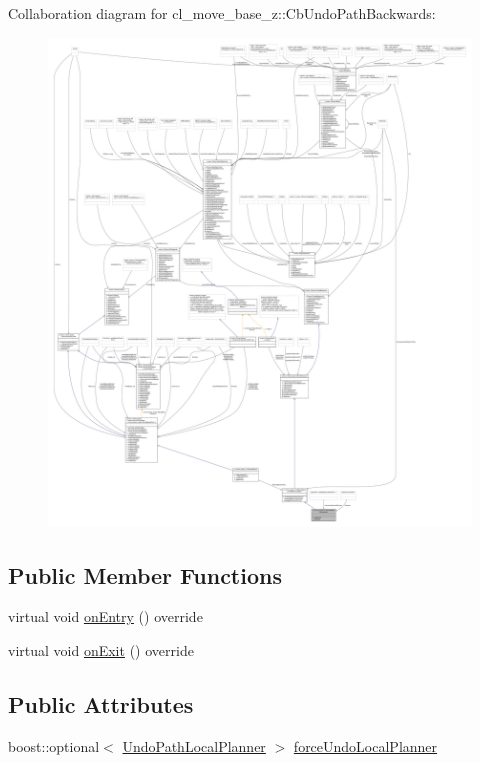 Collaboration diagram for cl\+\_\+move\+\_\+base\+\_\+z\+:\+:Cb\+Undo\+Path\+Backwards\+:
\nopagebreak
\begin{figure}[H]
\begin{center}
\leavevmode
\includegraphics[width=350pt]{classcl__move__base__z_1_1CbUndoPathBackwards__coll__graph}
\end{center}
\end{figure}
\subsection*{Public Member Functions}
\begin{DoxyCompactItemize}
\item 
virtual void \hyperlink{classcl__move__base__z_1_1CbUndoPathBackwards_a32e680530375b62c7053bf173f6b2b1b}{on\+Entry} () override
\item 
virtual void \hyperlink{classcl__move__base__z_1_1CbUndoPathBackwards_a20cee921ad92db16f8d17c3c3b9c2daf}{on\+Exit} () override
\end{DoxyCompactItemize}
\subsection*{Public Attributes}
\begin{DoxyCompactItemize}
\item 
boost\+::optional$<$ \hyperlink{namespacecl__move__base__z_aa8702d7f4bc14a650da006a263801a8b}{Undo\+Path\+Local\+Planner} $>$ \hyperlink{classcl__move__base__z_1_1CbUndoPathBackwards_a2dfb07d7391147e2fc06e01749bfd5bc}{force\+Undo\+Local\+Planner}
\end{DoxyCompactItemize}
